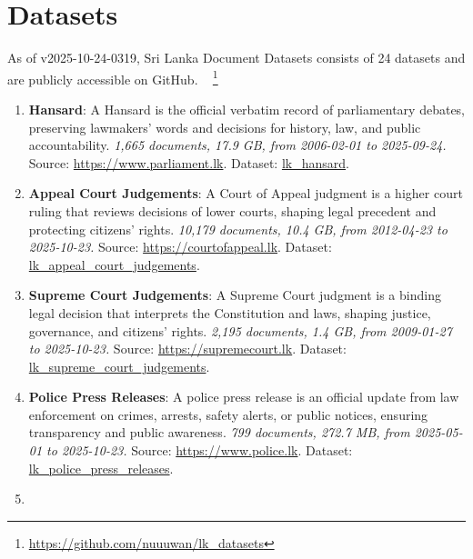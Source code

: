 \documentclass[10pt,a4paper]{article}%
\begin{document}
%
\section{Datasets}%
\label{sec:Datasets}%
As of v2025-10-24-0319, Sri Lanka Document Datasets
  consists of 24 datasets
 and are publicly accessible on GitHub.%
~%
\footnote{\href{https://github.com/nuuuwan/lk\_datasets}{https://github.com/nuuuwan/lk\_datasets}}%

%
\begin{enumerate}%
\item%
\textbf{Hansard}: A Hansard is the official verbatim record of parliamentary debates, preserving lawmakers’ words and decisions for history, law, and public accountability.\textit{ 1,665 documents, 17.9 GB, from 2006{-}02{-}01 to 2025{-}09{-}24.} Source: \href{https://www.parliament.lk}{https://www.parliament.lk}. Dataset: \href{https://github.com/nuuuwan/lk\_hansard/tree/data/data/lk\_hansard}{lk\_hansard}.%
\item%
\textbf{Appeal Court Judgements}: A Court of Appeal judgment is a higher court ruling that reviews decisions of lower courts, shaping legal precedent and protecting citizens’ rights.\textit{ 10,179 documents, 10.4 GB, from 2012{-}04{-}23 to 2025{-}10{-}23.} Source: \href{https://courtofappeal.lk}{https://courtofappeal.lk}. Dataset: \href{https://github.com/nuuuwan/lk\_appeal\_court\_judgements/tree/data/data/lk\_appeal\_court\_judgements}{lk\_appeal\_court\_judgements}.%
\item%
\textbf{Supreme Court Judgements}: A Supreme Court judgment is a binding legal decision that interprets the Constitution and laws, shaping justice, governance, and citizens’ rights.\textit{ 2,195 documents, 1.4 GB, from 2009{-}01{-}27 to 2025{-}10{-}23.} Source: \href{https://supremecourt.lk}{https://supremecourt.lk}. Dataset: \href{https://github.com/nuuuwan/lk\_supreme\_court\_judgements/tree/data/data/lk\_supreme\_court\_judgements}{lk\_supreme\_court\_judgements}.%
\item%
\textbf{Police Press Releases}: A police press release is an official update from law enforcement on crimes, arrests, safety alerts, or public notices, ensuring transparency and public awareness.\textit{ 799 documents, 272.7 MB, from 2025{-}05{-}01 to 2025{-}10{-}23.} Source: \href{https://www.police.lk}{https://www.police.lk}. Dataset: \href{https://github.com/nuuuwan/lk\_police\_press\_releases/tree/data/data/lk\_police\_press\_releases}{lk\_police\_press\_releases}.%
\item%

\end{enumerate}
\end{document}
